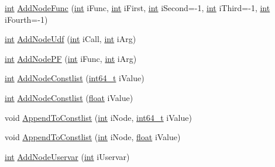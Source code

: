 \begin{DoxyCompactItemize}
\item 
\hyperlink{sphinxexpr_8cpp_a4a26e8f9cb8b736e0c4cbf4d16de985e}{int} \hyperlink{classExprParser__t_ad7af2c991687f27a92acaf052370ba79}{Add\-Node\-Func} (\hyperlink{sphinxexpr_8cpp_a4a26e8f9cb8b736e0c4cbf4d16de985e}{int} i\-Func, \hyperlink{sphinxexpr_8cpp_a4a26e8f9cb8b736e0c4cbf4d16de985e}{int} i\-First, \hyperlink{sphinxexpr_8cpp_a4a26e8f9cb8b736e0c4cbf4d16de985e}{int} i\-Second=-\/1, \hyperlink{sphinxexpr_8cpp_a4a26e8f9cb8b736e0c4cbf4d16de985e}{int} i\-Third=-\/1, \hyperlink{sphinxexpr_8cpp_a4a26e8f9cb8b736e0c4cbf4d16de985e}{int} i\-Fourth=-\/1)
\item 
\hyperlink{sphinxexpr_8cpp_a4a26e8f9cb8b736e0c4cbf4d16de985e}{int} \hyperlink{classExprParser__t_a7a0ff196086f3b4ce2a75b80d840b9b9}{Add\-Node\-Udf} (\hyperlink{sphinxexpr_8cpp_a4a26e8f9cb8b736e0c4cbf4d16de985e}{int} i\-Call, \hyperlink{sphinxexpr_8cpp_a4a26e8f9cb8b736e0c4cbf4d16de985e}{int} i\-Arg)
\item 
\hyperlink{sphinxexpr_8cpp_a4a26e8f9cb8b736e0c4cbf4d16de985e}{int} \hyperlink{classExprParser__t_a364a20ce447d018d80d69acbb080c1a6}{Add\-Node\-P\-F} (\hyperlink{sphinxexpr_8cpp_a4a26e8f9cb8b736e0c4cbf4d16de985e}{int} i\-Func, \hyperlink{sphinxexpr_8cpp_a4a26e8f9cb8b736e0c4cbf4d16de985e}{int} i\-Arg)
\item 
\hyperlink{sphinxexpr_8cpp_a4a26e8f9cb8b736e0c4cbf4d16de985e}{int} \hyperlink{classExprParser__t_a7e47f688af91e19f09daf8c53e0fc87a}{Add\-Node\-Constlist} (\hyperlink{sphinxstd_8h_a996e72f71b11a5bb8b3b7b6936b1516d}{int64\-\_\-t} i\-Value)
\item 
\hyperlink{sphinxexpr_8cpp_a4a26e8f9cb8b736e0c4cbf4d16de985e}{int} \hyperlink{classExprParser__t_a53603b823261d635d76ba8b87fce8e20}{Add\-Node\-Constlist} (\hyperlink{sphinxexpr_8cpp_a0e0d0739f7035f18f949c2db2c6759ec}{float} i\-Value)
\item 
void \hyperlink{classExprParser__t_a3e8ede5a3e41ee48f2533216db2be7ff}{Append\-To\-Constlist} (\hyperlink{sphinxexpr_8cpp_a4a26e8f9cb8b736e0c4cbf4d16de985e}{int} i\-Node, \hyperlink{sphinxstd_8h_a996e72f71b11a5bb8b3b7b6936b1516d}{int64\-\_\-t} i\-Value)
\item 
void \hyperlink{classExprParser__t_a7b2029dbde3477b094d83aefcfa6f8c4}{Append\-To\-Constlist} (\hyperlink{sphinxexpr_8cpp_a4a26e8f9cb8b736e0c4cbf4d16de985e}{int} i\-Node, \hyperlink{sphinxexpr_8cpp_a0e0d0739f7035f18f949c2db2c6759ec}{float} i\-Value)
\item 
\hyperlink{sphinxexpr_8cpp_a4a26e8f9cb8b736e0c4cbf4d16de985e}{int} \hyperlink{classExprParser__t_afcbdc7c1b5542bea960696bd3347611c}{Add\-Node\-Uservar} (\hyperlink{sphinxexpr_8cpp_a4a26e8f9cb8b736e0c4cbf4d16de985e}{int} i\-Uservar)

\end{DoxyCompactItemize}

